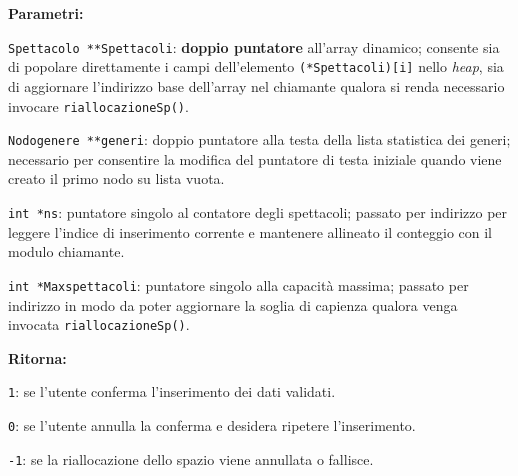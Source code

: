 \documentclass[11pt,a4paper,oneside,openany]{book}
\newenvironment{listacomp}{%
    \small
    \begin{list}{\textendash}{%
        \setlength{\topsep}{2pt}%
        \setlength{\partopsep}{0pt}%
        \setlength{\itemsep}{1pt}%
        \setlength{\parsep}{0pt}%
        \setlength{\leftmargin}{1.2em}%
    }%
}{%
    \end{list}%
}
\begin{document}
\noindent\textbf{Parametri:}
\begin{listacomp}
    \item \texttt{Spettacolo **Spettacoli}: \textbf{doppio puntatore} all'array dinamico; consente sia di popolare direttamente i campi dell'elemento \texttt{(*Spettacoli)[i]} nello \emph{heap}, sia di aggiornare l'indirizzo base dell'array nel chiamante qualora si renda necessario invocare \texttt{riallocazioneSp()}.
    \item \texttt{Nodogenere **generi}: doppio puntatore alla testa della lista statistica dei generi; necessario per consentire la modifica del puntatore di testa iniziale quando viene creato il primo nodo su lista vuota.
    \item \texttt{int *ns}: puntatore singolo al contatore degli spettacoli; passato per indirizzo per leggere l'indice di inserimento corrente e mantenere allineato il conteggio con il modulo chiamante.
    \item \texttt{int *Maxspettacoli}: puntatore singolo alla capacità massima; passato per indirizzo in modo da poter aggiornare la soglia di capienza qualora venga invocata \texttt{riallocazioneSp()}.
\end{listacomp}

\noindent\textbf{Ritorna:}
\begin{listacomp}
    \item \texttt{1}: se l'utente conferma l'inserimento dei dati validati.
    \item \texttt{0}: se l'utente annulla la conferma e desidera ripetere l'inserimento.
    \item \texttt{-1}: se la riallocazione dello spazio viene annullata o fallisce.
\end{listacomp}
\end{document}
